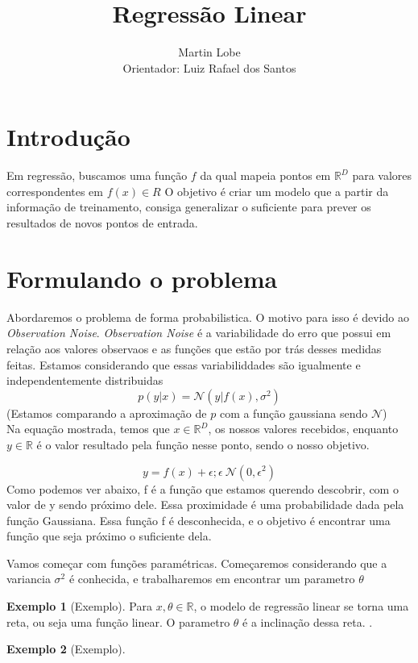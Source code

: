 \documentclass[a4paper, 12pt]{scrartcl}
\title{Regressão Linear}
\author{Martin Lobe \\ Orientador: Luiz Rafael dos Santos}
\date{}
\theoremstyle{plain}%
\theoremstyle{definition}
\newtheorem{exmp}{Exemplo}
\theoremstyle{remark}
\def \Real {\mathds{R}}
\begin{document}
\onehalfspacing
\maketitle
 
\section*{Introdução}

Em regressão, buscamos uma função $f$ da qual mapeia pontos em $\Real^D$ para valores correspondentes em $f(x) \in R$
O objetivo é criar um modelo que a partir da informação de treinamento, consiga generalizar o suficiente para prever os resultados de novos pontos de entrada.



\section{Formulando o problema}
Abordaremos o problema de forma probabilistica. O motivo para isso é devido ao \textit{Observation Noise}.
\textit{Observation Noise} é a variabilidade do erro que possui em relação aos valores observaos e as funções que estão por trás desses medidas feitas. 
Estamos considerando que essas variabiliddades são igualmente e independentemente distribuidas
\[
    p(y|x) = \mathcal{N}(y|f(x), \sigma^2)
\]
(Estamos comparando a aproximação de $p$ com a função gaussiana sendo $\mathcal{N}$)
\\
Na equação mostrada, temos que $x \in \Real^D$, os nossos valores recebidos, enquanto $y \in \Real$ é o valor resultado pela função nesse ponto, sendo o nosso objetivo.

\[
    y = f(x)+\epsilon ; \epsilon ~ \mathcal{N}(0,\epsilon^2)
\]
Como podemos ver abaixo, f é a função que estamos querendo descobrir, com o valor de y sendo próximo dele. Essa proximidade é uma probabilidade dada pela função Gaussiana.
Essa função f é desconhecida, e o objetivo é encontrar uma função que seja próximo o suficiente dela.

Vamos começar com funções paramétricas. Começaremos considerando que a variancia $\sigma^2$ é conhecida, e trabalharemos em encontrar um parametro $\theta$

\begin{exmp}[Exemplo]\label{exmp: B} 
Para $ x,\theta \in \Real $, o modelo de regressão linear se torna uma reta, ou seja uma função linear.
O parametro $\theta $ é a inclinação dessa reta. .
\end{exmp}




\begin{exmp}[Exemplo]\label{exmp: B} 
\end{exmp}


\end{document}
